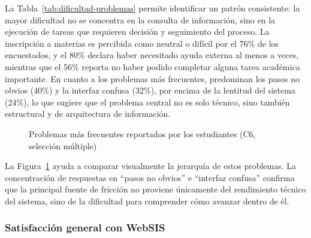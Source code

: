 La Tabla~\ref{tab:dificultad-problemas} permite identificar un patrón consistente: la mayor dificultad no se concentra en la consulta de información, sino en la ejecución de tareas que requieren decisión y seguimiento del proceso. La inscripción a materias es percibida como neutral o difícil por el 76\% de los encuestados, y el 80\% declara haber necesitado ayuda externa al menos a veces, mientras que el 56\% reporta no haber podido completar alguna tarea académica importante. En cuanto a los problemas más frecuentes, predominan los pasos no obvios (40\%) y la interfaz confusa (32\%), por encima de la lentitud del sistema (24\%), lo que sugiere que el problema central no es solo técnico, sino también estructural y de arquitectura de información.
 
\begin{figure}[H]
\centering
{}
\caption{Problemas más frecuentes reportados por los estudiantes (C6, selección múltiple)}
\label{fig:problemas-frecuentes}
\end{figure}

La Figura~\ref{fig:problemas-frecuentes} ayuda a comparar visualmente la jerarquía de estos problemas. La concentración de respuestas en ``pasos no obvios'' e ``interfaz confusa'' confirma que la principal fuente de fricción no proviene únicamente del rendimiento técnico del sistema, sino de la dificultad para comprender cómo avanzar dentro de él.
 
\subsubsection{Satisfacción general con WebSIS}
 
